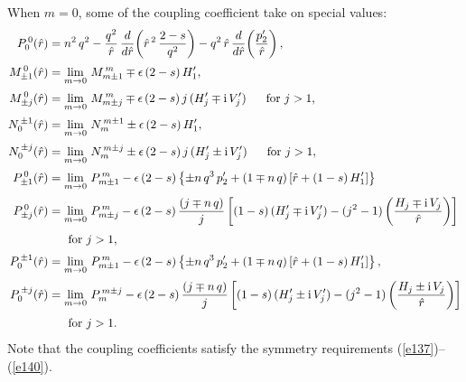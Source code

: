 \documentclass[12pt,prb,aps]{revtex4-1}
\begin{document}
When $m=0$, some of the coupling coefficient take on special values: 
\begin{align}
P_0^{\,0}(\hat{r})&=n^2\,q^2-\frac{q^2}{\hat{r}}\,\frac{d}{d\hat{r}}\!\left(\hat{r}^{\,2}\,\frac{2-s}{q^2}\right)-q^2\,\hat{r}\,\frac{d}{d\hat{r}}\!\left(
\frac{p_2'}{\hat{r}}\right),\\[0.5ex]
M_{\pm 1}^{\,0}(\hat{r}) &= \lim_{m\rightarrow 0}\,M_{m\pm 1}^{\,m} \mp\epsilon\,(2-s)\,H_1',\\[0.5ex]
M_{\pm j}^{\,0}(\hat{r}) &= \lim_{m\rightarrow 0}\,M_{m\pm j}^{\,m} \mp\epsilon\,(2-s)\,j\,(H_j'\mp{\rm i}\,V_j')\mbox{~~~~~for $j>1$},\\[0.5ex]
N_0^{\,\pm 1}(\hat{r}) &= \lim_{m\rightarrow 0}\,N_m^{\,m\pm 1} \pm\epsilon\,(2-s)\,H_1',\\[0.5ex]
N_0^{\,\pm j}(\hat{r}) &= \lim_{m\rightarrow 0}\,N_m^{\,m\pm j} \pm\epsilon\,(2-s)\,j\,(H_j'\pm{\rm i}\,V_j')\mbox{~~~~~for $j>1$},\\[0.5ex]
P_{\pm 1}^{\,0}(\hat{r})&= \lim_{m\rightarrow 0}\,P_{m\pm 1}^{\,m}-\epsilon\,(2-s)\left\{\pm n\,q^3\,p_2'+(1\mp n\,q)\left[\hat{r}+(1-s)\,H_1'\right]\right\}\\[0.5ex]
P_{\pm j}^{\,0}(\hat{r}) & =\lim_{m\rightarrow 0}\,P_{m\pm j}^{\,m}-\epsilon\,(2-s)\,\frac{(j\mp n\,q)}{j}
\left[(1-s)\,(H_j'\mp{\rm i}\,V_j')-(j^2-1)\left(\frac{H_j\mp {\rm i}\,V_j}{\hat{r}}\right)\right]\nonumber\\[0.5ex]&\mbox{~~~~~for $j>1$},\\[0.5ex]
P_0^{\,\pm 1}(\hat{r})&= \lim_{m\rightarrow 0}\,P_{m\pm 1}^{\,m}-\epsilon\,(2-s)\left\{\pm n\,q^3\,p_2'+(1\mp n\,q)\left[\hat{r}+(1-s)\,H_1'\right]\right\},\\[0.5ex]
P_0^{\,\pm j}(\hat{r})&=\lim_{m\rightarrow 0}\,P_m^{\,m\pm j}-\epsilon\,(2-s)\,\frac{(j\mp n\,q)}{j}
\left[(1-s)\,(H_j'\pm {\rm i}\,V_j')-(j^2-1)\left(\frac{H_j\pm {\rm i}\,V_j}{\hat{r}}\right)\right]\nonumber\\[0.5ex]&\mbox{~~~~~for $j>1$}.
\end{align}
Note that the coupling coefficients satisfy the symmetry requirements (\ref{e137})--(\ref{e140}).
\end{document}
